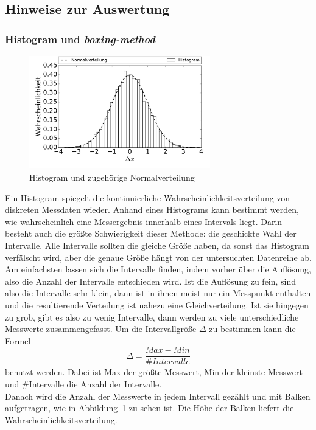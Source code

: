 \subsection*{Hinweise zur Auswertung}

\subsubsection*{Histogram und \emph{boxing-method}}
\begin{figure}[h!]
  \centering
  \includegraphics[width=0.7\textwidth]{figures/histogram}
  \caption{Histogram und zugehörige Normalverteilung}\label{fig:histo}
\end{figure}
Ein Histogram spiegelt die kontinuierliche Wahrscheinlichkeitsverteilung von diskreten Messdaten wieder. Anhand eines Histograms kann bestimmt werden, wie wahrscheinlich eine Messergebnis innerhalb eines Intervals liegt. Darin besteht auch die größte Schwierigkeit dieser Methode: die geschickte Wahl der Intervalle. Alle Intervalle sollten die gleiche Größe haben, da sonst das Histogram verfälscht wird, aber die genaue Größe hängt von der untersuchten  Datenreihe ab.\\
Am einfachsten lassen sich die Intervalle finden, indem vorher über die Auflösung, also die Anzahl der Intervalle entschieden wird.  Ist die Auflösung zu fein, sind also die Intervalle sehr klein, dann ist in ihnen meist nur ein Messpunkt enthalten und die resultierende Verteilung ist nahezu eine Gleichverteilung. Ist sie hingegen zu grob, gibt es also zu wenig Intervalle, dann werden zu viele unterschiedliche Messwerte zusammengefasst. Um die Intervallgröße $\Delta$ zu bestimmen kann die Formel
\begin{equation}
  \Delta = \frac{Max - Min}{\#Intervalle}
\end{equation}
benutzt werden. Dabei ist Max der größte Messwert, Min der kleinste Messwert und \#Intervalle die Anzahl der Intervalle.\\
Danach wird die Anzahl der Messwerte in jedem Intervall gezählt und mit Balken aufgetragen, wie in Abbildung~\ref{fig:histo} zu sehen ist. Die Höhe der Balken liefert die Wahrscheinlichkeitsverteilung.

